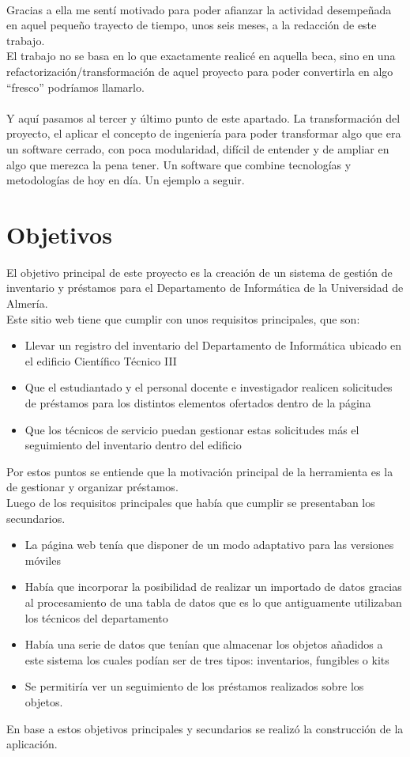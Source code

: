 \\Gracias a ella me sentí motivado para poder afianzar la actividad desempeñada en aquel pequeño trayecto de tiempo, unos seis meses, a la redacción de este trabajo.
\\El trabajo no se basa en lo que exactamente realicé en aquella beca, sino en una refactorización/transformación de aquel proyecto para poder convertirla en algo ``fresco'' podríamos llamarlo.
\\\\Y aquí pasamos al tercer y último punto de este apartado. La transformación del proyecto, el aplicar el concepto de ingeniería para poder transformar algo que era un software cerrado, con poca modularidad, difícil de entender y de ampliar en algo que merezca la pena tener. Un software que combine tecnologías y metodologías de hoy en día. Un ejemplo a seguir.

\section{Objetivos}

El objetivo principal de este proyecto es la creación de un sistema de gestión de inventario y préstamos para el Departamento de Informática de la Universidad de Almería.
\\Este sitio web tiene que cumplir con unos requisitos principales, que son:

\begin{itemize}
    \item Llevar un registro del inventario del Departamento de Informática ubicado en el edificio Científico Técnico III
    \item Que el estudiantado y el personal docente e investigador realicen solicitudes de préstamos para los distintos elementos ofertados dentro de la página
    \item Que los técnicos de servicio puedan gestionar estas solicitudes más el seguimiento del inventario dentro del edificio
\end{itemize}
Por estos puntos se entiende que la motivación principal de la herramienta es la de gestionar y organizar préstamos.
\\Luego de los requisitos principales que había que cumplir se presentaban los secundarios.

\begin{itemize}
    \item La página web tenía que disponer de un modo adaptativo para las versiones móviles
    \item Había que incorporar la posibilidad de realizar un importado de datos gracias al procesamiento de una tabla de datos que es lo que antiguamente utilizaban los técnicos del departamento
    \item Había una serie de datos que tenían que almacenar los objetos añadidos a este sistema los cuales podían ser de tres tipos: inventarios, fungibles o kits
    \item Se permitiría ver un seguimiento de los préstamos realizados sobre los objetos.
\end{itemize}
En base a estos objetivos principales y secundarios se realizó la construcción de la aplicación.

